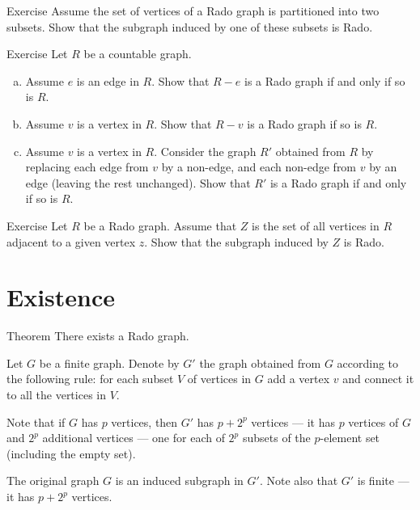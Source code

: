 \begin{thm}{Exercise}\label{ex:rado-partition}
Assume the set of vertices of a Rado graph is partitioned into two subsets.
Show that the subgraph induced by one of these subsets is Rado.
\end{thm}

\begin{thm}{Exercise}\label{ex:R-e-v-rev}
Let $R$ be a countable graph. 
\begin{enumerate}[(a)]
 \item Assume  $e$ is an edge in $R$. 
 Show that $R-e$ is a Rado graph if and only if so is $R$.
 
 \item Assume $v$ is a vertex in $R$. 
 Show that $R-v$ is a Rado graph if so is $R$.
 
 \item Assume $v$ is a vertex in $R$. 
 Consider the graph $R'$ obtained from $R$ by replacing each edge from $v$ by a non-edge, and each non-edge from $v$ by an edge (leaving the rest unchanged).
 Show that $R'$ is a Rado graph if and only if so is $R$. 
\end{enumerate}

\end{thm}

\begin{thm}{Exercise}\label{ex:rado-link}
Let $R$ be a Rado graph.
Assume that $Z$ is the set of all vertices in $R$ adjacent to a given vertex $z$.
Show that the subgraph induced by $Z$ is Rado.
\end{thm}


\section{Existence}

\begin{thm}{Theorem}
There exists a Rado graph.
\end{thm}

Let $G$ be a finite graph.
Denote by $G'$ the graph obtained from $G$ according to the following rule:
for each subset $V$ of vertices in $G$ add a vertex $v$ and connect it to all the vertices in $V$.

Note that if $G$ has $p$ vertices, then $G'$ has $p+2^p$ vertices --- it has $p$ vertices of $G$ and $2^p$ additional vertices --- one for each of $2^p$ subsets of the $p$-element set (including the empty set).

The original graph $G$ is an induced subgraph in $G'$.
Note also that $G'$ is finite --- it has $p+2^p$ vertices.

